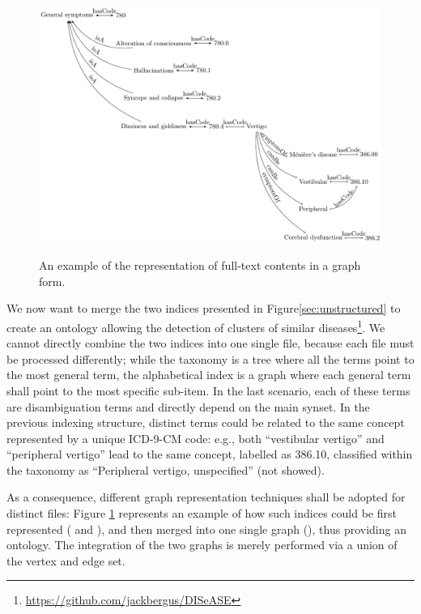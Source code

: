 \begin{figure}
	
	\begin{minipage}[t]{\textwidth}
		\includegraphics[width=\textwidth]{fig/01dataint/04_fromfulltext03.pdf}
		\label{fig:astaxonomy2}
	\end{minipage}
	\caption{An example of the representation of full-text contents in a graph form.}
	\label{fig:mergedgraphsfromfull}
\end{figure}
\begin{example}
We now want to merge the two indices presented in Figure\ref{sec:unstructured} to create an ontology allowing the detection of clusters of similar diseases\footnote{\url{https://github.com/jackbergus/DISeASE}}. We cannot directly combine the two indices into one single file, because each file must be processed differently; while the taxonomy is a tree where all the terms point to the most general term, the alphabetical index is a graph where each general term shall point to the most specific sub-item. In the last scenario, each of these terms are disambiguation terms and directly depend on the main synset. In the previous indexing structure, distinct terms could be related to the same concept represented by a unique ICD-9-CM code: e.g., both ``vestibular vertigo'' and ``peripheral vertigo'' lead to the same concept, labelled as 386.10, classified within the taxonomy as ``Peripheral vertigo, unspecified'' (not showed).
  
  As a consequence, different graph representation techniques shall be adopted for distinct files: Figure \ref{fig:mergedgraphsfromfull} represents an example of how such indices could be first represented ( and ), and then merged into one single graph (), thus providing an ontology. The integration of the two graphs is merely performed via a union of the vertex and edge set.
\end{example}


